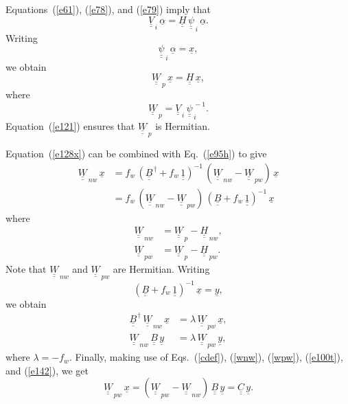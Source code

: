 \documentclass[12pt,prb,aps,notitlepage]{revtex4-1}
\begin{document}
Equations~(\ref{e61}), (\ref{e78}), and (\ref{e79}) imply that 
\begin{equation}
\underline{\underline{V}}_{\,i}\,\underline{\alpha}=\underline{\underline{H}}\,\underline{\underline{\psi}}_{\,i}\,\underline{\alpha}.
\end{equation}
Writing
\begin{equation}
\underline{\underline{\psi}}_{\,i}\,\underline{\alpha} = \underline{x},
\end{equation}
we obtain
\begin{equation}\label{e95h}
\underline{\underline{W}}_{\,p}\,\underline{x}
= \underline{\underline{H}}\,\underline{x},
\end{equation}
where
\begin{equation}\label{e128}
\underline{\underline{W}}_{\,p} = \underline{\underline{V}}_{\,i}\,\underline{\underline{\psi}}_{\,i}^{\,-1}.
\end{equation}
Equation~(\ref{e121}) ensures that $\underline{\underline{W}}_{\,p}$ is Hermitian. 

Equation~(\ref{e128x}) can be combined with Eq.~(\ref{e95h}) to give
\begin{align}
\underline{\underline{W}}_{\,nw}\,\underline{x} &= f_w\,(\underline{\underline{B}}^{\,\dag}+f_w\,\underline{\underline{1}})^{-1}\,( \underline{\underline{W}}_{\,nw} - \underline{\underline{W}}_{\,pw} )\,\underline{x}\nonumber\\[0.5ex]
&=f_w\,(\underline{\underline{W}}_{\,nw} - \underline{\underline{W}}_{\,pw} )\,(\underline{\underline{B}}+f_w\,\underline{\underline{1}})^{-1}\,\underline{x}
\end{align}
where
\begin{align}\label{wnw}
\underline{\underline{W}}_{\,nw}  &= \underline{\underline{W}}_{\,p}-\underline{\underline{H}}_{\,nw},\\[0.5ex]
\underline{\underline{W}}_{\,pw}  &= \underline{\underline{W}}_{\,p}-\underline{\underline{H}}_{\,pw}.\label{wpw}
\end{align}
Note that $\underline{\underline{W}}_{\,nw}$ and $\underline{\underline{W}}_{\,pw}$ are Hermitian.
Writing
\begin{equation}\label{e100t}
(\underline{\underline{B}}+f_w\,\underline{\underline{1}})^{-1} \,\underline{x}= \underline{y},
\end{equation}
we obtain
\begin{align}\label{e141}
\underline{\underline{B}}^{\,\dag}\,\underline{\underline{W}}_{\,nw}\,\underline{x}&=\lambda\,\underline{\underline{W}}_{\,pw}\,\underline{x},\\[0.5ex]
\underline{\underline{W}}_{\,nw}\,\underline{\underline{B}}\,\underline{y} &=\lambda\,\underline{\underline{W}}_{\,pw}\,\underline{y},\label{e142}
\end{align}
where $\lambda= -f_w$. Finally, making use of Eqs.~(\ref{cdef}), (\ref{wnw}),  (\ref{wpw}), (\ref{e100t}), and (\ref{e142}), we get
\begin{equation}
\underline{\underline{W}}_{\,pw}\,\underline{x}= (\underline{\underline{W}}_{\,pw}-\underline{\underline{W}}_{\,nw})\,\underline{\underline{B}}\,\underline{y} = 
\underline{\underline{C}}\,\underline{y}.\label{e143}
\end{equation}
\end{document}
